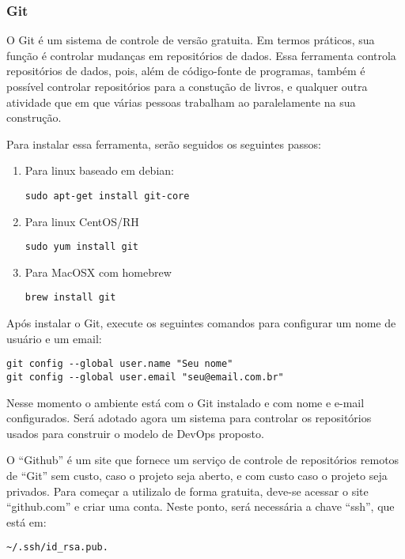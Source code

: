 \subsubsection{Git}

O Git é um sistema de controle de versão gratuita. 
Em termos práticos, sua função é controlar mudanças 
em repositórios de dados. Essa ferramenta controla 
repositórios de dados, pois, além de código-fonte de 
programas, também é possível controlar repositórios 
para a constução de livros, e qualquer outra 
atividade que em que várias pessoas trabalham ao 
paralelamente na sua construção.

Para instalar essa ferramenta, serão seguidos os 
seguintes passos:
  \begin{enumerate}
   \item Para linux baseado em debian:
      \begin{lstlisting}
sudo apt-get install git-core
      \end{lstlisting}
      
   \item Para linux CentOS/RH
      \begin{lstlisting}
sudo yum install git
      \end{lstlisting}
   
   \item Para MacOSX com homebrew
      \begin{lstlisting}
brew install git
      \end{lstlisting}
      
 \end{enumerate}
Após instalar o Git, execute os seguintes comandos 
para configurar um nome de usuário e um email: 

      \begin{lstlisting}
git config --global user.name "Seu nome"
git config --global user.email "seu@email.com.br"
      \end{lstlisting}

Nesse momento o ambiente está com o Git instalado 
e com nome e e-mail configurados. Será adotado 
agora um sistema para controlar os repositórios 
usados para construir o modelo de DevOps proposto.

O “Github” é um site que fornece um serviço de 
controle de repositórios remotos de “Git” sem custo,
caso o projeto seja aberto, e com custo caso o projeto 
seja privados. Para começar a utilizalo de forma 
gratuita, deve-se acessar o site “github.com” e criar 
uma conta. Neste ponto, será necessária a chave “ssh”, 
que está em:
      \begin{lstlisting}
~/.ssh/id_rsa.pub.
      \end{lstlisting}

